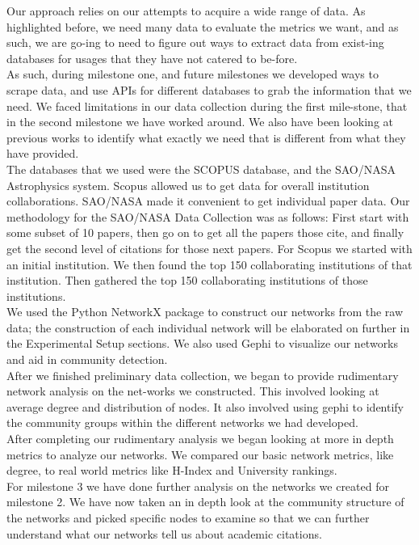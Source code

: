 \documentclass[times, 10pt,twocolumn]{article}
\begin{document}
Our approach relies on our attempts to acquire a wide range of data. As highlighted before, we need many data to evaluate the metrics we want, and as such, we are go-ing to need to figure out ways to extract data from exist-ing databases for usages that they have not catered to be-fore.\\
As such, during milestone one, and future milestones we developed ways to scrape data, and use APIs for different databases to grab the information that we need. We faced limitations in our data collection during the first mile-stone, that in the second milestone we have worked around. We also have been looking at previous works to identify what exactly we need that is different from what they have provided. \\
The databases that we used were the SCOPUS database, and the SAO/NASA Astrophysics system. Scopus allowed us to get data for overall institution collaborations. SAO/NASA made it convenient to get individual paper data. Our methodology for the SAO/NASA Data Collection was as follows: First start with some subset of 10 papers, then go on to get all the papers those cite, and finally get the second level of citations for those next papers. For Scopus we started with an initial institution. We then found the top 150 collaborating institutions of that institution. Then gathered the top 150 collaborating institutions  of those institutions. \\ 
We used the Python NetworkX package to construct our networks from the raw data; the construction of each individual network will be elaborated on further in the Experimental Setup sections. We also used Gephi to visualize our networks and aid in community detection. \\ 
After we finished preliminary data collection, we began to provide rudimentary network analysis on the net-works we constructed. This involved looking at  average degree and distribution of nodes. It also involved using gephi to identify the community groups within the different networks we had developed.  \\
After completing our rudimentary analysis we began looking at more in depth metrics to analyze our networks. We compared our basic network metrics, like degree, to real world metrics like H-Index and University rankings. \\
For milestone 3 we have done further analysis on the networks we created for milestone 2. We have now taken an in depth look at the community structure of the networks and picked specific nodes to examine so that we can further understand what our networks tell us about academic citations. 
\end{document}
